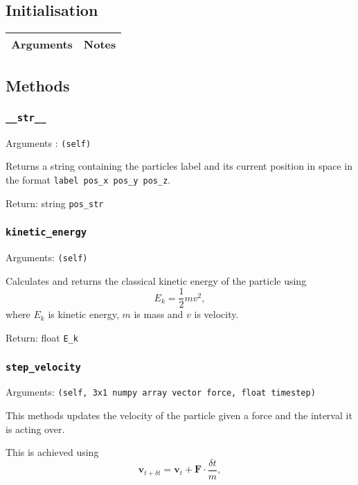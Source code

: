 \documentclass[a4paper, 11pt, british, left=1in, right=1in, top=0.3in, bottom=1in]{article}
\begin{document}
	\subsection{Initialisation}
	\begin{tabular}{|c|c|}
		\rowcolor{NavyBlue}
		\hline Arguments & Notes \\ 
		\hline 
		\end{tabular} 
	
	\subsection{Methods}
	
	\subsubsection{\texttt{\_\_str\_\_}}
	
	Arguments : \texttt{(self)}
	
	Returns a string containing the particles label and its current position in space in the format \texttt{label pos\_x pos\_y pos\_z}.
	
	Return: string \texttt{pos\_str}
	
	\subsubsection{\texttt{kinetic\_energy}}
	
	Arguments: \texttt{(self)}
	
	Calculates and returns the classical kinetic energy of the particle using $$E_k = \dfrac{1}{2}mv^2,$$ where $E_k$ is kinetic energy, $m$ is mass and $v$ is velocity.
	
	Return: float \texttt{E\_k}
	
	\subsubsection{\texttt{step\_velocity}}
	
	Arguments: \texttt{(self, 3x1 numpy array vector force, float timestep)}
	
	This methods updates the velocity of the particle given a force and the interval it is acting over. 
	
	This is achieved using $$\textbf{v}_{t+\delta t} = \textbf{v}_t + \textbf{F}\cdot\frac{\delta t}{m},$$
	
\end{document}
